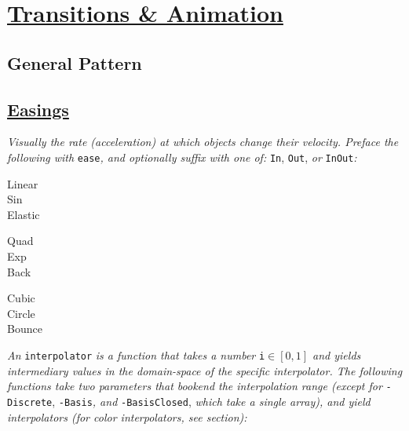 \section{\href{https://github.com/d3/d3-transition}{Transitions \& Animation}}


\subsection*{General Pattern}



\subsection*{\href{https://github.com/d3/d3-ease}{Easings}}
\textit{Visually  the rate (acceleration) at which objects change their velocity. Preface the following with }\texttt{ease}\textit{, and optionally suffix with one of: }\texttt{In}, \texttt{Out},\textit{ or }\texttt{InOut}\textit{:}\\
{\footnotesize
\begin{minipage}[t]{2.0cm}
    Linear\\
    Sin\\
    Elastic
\end{minipage}
\begin{minipage}[t]{2.0cm}
    Quad\\
    Exp\\
    Back
\end{minipage}
\begin{minipage}[t]{2.0cm}
    Cubic\\
    Circle\\
    Bounce
\end{minipage}
}


\textit{An }\texttt{interpolator}\textit{ is a function that takes a number }\texttt{i}\textit{$\in [0,1]$ and yields intermediary values in the domain-space of the specific interpolator. The following functions take two parameters that bookend the interpolation range (except for }\texttt{-Discrete}, \texttt{-Basis}\textit{, and }\texttt{-BasisClosed},\textit{ which take a single array), and yield interpolators (for color interpolators, see  section):}

